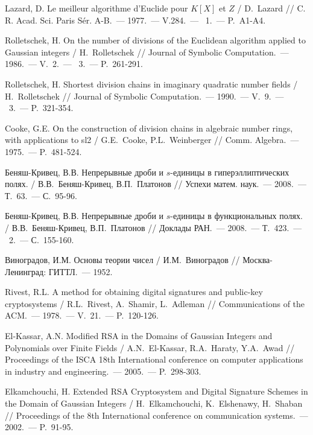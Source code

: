 \documentclass[_00_dissertation.tex]{subfiles}
\begin{document}
\begin{thebibliography}{99}
    Lazard, D. Le meilleur algorithme d'{E}uclide pour {$K[X]$} et {$Z$} / D.~Lazard // C. R. Acad. Sci. Paris S\'er. A-B.~--- 1977.~--- V.284.~--- \textnumero~1.~--- P.~A1-A4.

    Rolletschek, H. On the number of divisions of the Euclidean algorithm applied to Gaussian integers / H.~Rolletschek // Journal of Symbolic Computation.~--- 1986.~--- V.~2.~--- \textnumero~3.~--- P.~261-291.
    
    Rolletschek, H. Shortest division chains in imaginary quadratic number fields / H.~Rolletschek // Journal of Symbolic Computation.~--- 1990.~--- V.~9.~--- \textnumero~3.~--- P.~321-354.

    Cooke, G.E. On the construction of division chains in algebraic number rings, with applications to sl2 / G.E.~Cooke, P.L.~Weinberger // Comm. Algebra.~--- 1975.~--- P.~481-524.

    Беняш-Кривец, В.В. Непрерывные дроби и $s$-единицы в гиперэллиптических полях. / В.В.~Беняш-Кривец, В.П.~Платонов // Успехи матем. наук.~--- 2008.~--- Т.~63.~--- С.~95-96.
    
    Беняш-Кривец, В.В. Непрерывные дроби и $s$-единицы в функциональных полях. / В.В.~Беняш-Кривец, В.П.~Платонов // Доклады РАН.~--- 2008.~--- Т.~423.~--- \textnumero~2.~--- С.~155-160.

    Виноградов, И.М. Основы теории чисел / И.М.~Виноградов // Москва-Ленинград: ГИТТЛ.~--- 1952.

    Rivest, R.L. A method for obtaining digital signatures and public-key cryptosystems / R.L.~Rivest, A.~Shamir, L.~Adleman // Communications of the ACM.~--- 1978.~--- V.~21.~--- P.~120-126.

    El-Kassar, A.N. Modified RSA in the Domains of Gaussian Integers and Polynomials over Finite Fields / A.N.~El-Kassar, R.A.~Haraty, Y.A.~Awad // Proceedings of the ISCA 18th International conference on computer applications in industry and engineering.~--- 2005.~--- P.~298-303.

    Elkamchouchi, H. Extended RSA Cryptosystem and Digital Signature Schemes in the Domain of Gaussian Integers / H.~Elkamchouchi, K.~Elshenawy, H.~Shaban // Proceedings of the 8th International conference on communication systems.~--- 2002.~--- P.~91-95.


\end{thebibliography}
\end{document}
